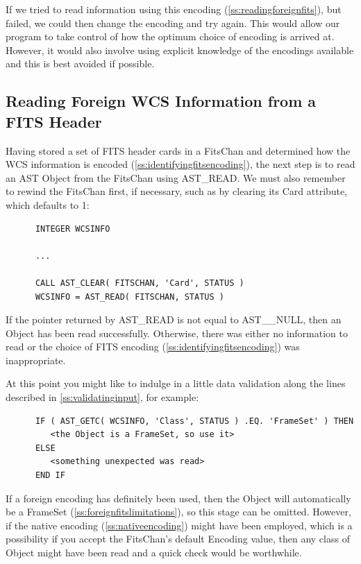 \documentclass[twoside,11pt]{article}
\newcommand{\htmlref}[2]{#1}
\newcommand{\secref}[1]{\S\ref{#1}}
\renewcommand{\secref}[1]{\ref{#1}}
\begin{document}
If we tried to read information using this encoding
(\secref{ss:readingforeignfits}), but failed, we could then change the
encoding and try again.  This would allow our program to take control
of how the optimum choice of encoding is arrived at. However, it would
also involve using explicit knowledge of the encodings available and
this is best avoided if possible.

\subsection{\label{ss:readingforeignfits}Reading Foreign WCS Information from a FITS Header}

Having stored a set of FITS header cards in a \htmlref{FitsChan}{FitsChan} and determined
how the WCS information is encoded
(\secref{ss:identifyingfitsencoding}), the next step is to read an AST
\htmlref{Object}{Object} from the FitsChan using \htmlref{AST\_READ}{AST_READ}. We must also remember to
rewind the FitsChan first, if necessary, such as by clearing its \htmlref{Card}{Card}
attribute, which defaults to 1:

\small
\begin{verbatim}
      INTEGER WCSINFO

      ...

      CALL AST_CLEAR( FITSCHAN, 'Card', STATUS )
      WCSINFO = AST_READ( FITSCHAN, STATUS )
\end{verbatim}
\normalsize

If the pointer returned by AST\_READ is not equal to AST\_\_NULL, then
an Object has been read successfully. Otherwise, there was either no
information to read or the choice of FITS encoding
(\secref{ss:identifyingfitsencoding}) was inappropriate.

At this point you might like to indulge in a little data validation
along the lines described in \secref{ss:validatinginput}, for example:

\small
\begin{verbatim}
      IF ( AST_GETC( WCSINFO, 'Class', STATUS ) .EQ. 'FrameSet' ) THEN
         <the Object is a FrameSet, so use it>
      ELSE
         <something unexpected was read>
      END IF
\end{verbatim}
\normalsize

If a foreign encoding has definitely been used, then the Object will
automatically be a \htmlref{FrameSet}{FrameSet} (\secref{ss:foreignfitslimitations}), so
this stage can be omitted. However, if the native encoding
(\secref{ss:nativeencoding}) might have been employed, which is a
possibility if you accept the FitsChan's default \htmlref{Encoding}{Encoding} value, then
any class of Object might have been read and a quick check would be
worthwhile.
\end{document}
